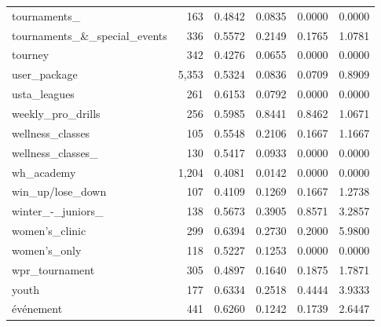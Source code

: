 \begin{table}[htbp]
\begin{tabular}{lrrrrr}
  tournaments\_ & 163 & 0.4842 & 0.0835 & 0.0000 & 0.0000 \\
  tournaments\_\&\_special\_events & 336 & 0.5572 & 0.2149 & 0.1765 & 1.0781 \\
  tourney & 342 & 0.4276 & 0.0655 & 0.0000 & 0.0000 \\
  user\_package & 5,353 & 0.5324 & 0.0836 & 0.0709 & 0.8909 \\
  usta\_leagues & 261 & 0.6153 & 0.0792 & 0.0000 & 0.0000 \\
  weekly\_pro\_drills & 256 & 0.5985 & 0.8441 & 0.8462 & 1.0671 \\
  wellness\_classes & 105 & 0.5548 & 0.2106 & 0.1667 & 1.1667 \\
  wellness\_classes\_ & 130 & 0.5417 & 0.0933 & 0.0000 & 0.0000 \\
  wh\_academy & 1,204 & 0.4081 & 0.0142 & 0.0000 & 0.0000 \\
  win\_up/lose\_down & 107 & 0.4109 & 0.1269 & 0.1667 & 1.2738 \\
  winter\_-\_juniors\_ & 138 & 0.5673 & 0.3905 & 0.8571 & 3.2857 \\
  women's\_clinic & 299 & 0.6394 & 0.2730 & 0.2000 & 5.9800 \\
  women's\_only & 118 & 0.5227 & 0.1253 & 0.0000 & 0.0000 \\
  wpr\_tournament & 305 & 0.4897 & 0.1640 & 0.1875 & 1.7871 \\
  youth & 177 & 0.6334 & 0.2518 & 0.4444 & 3.9333 \\
  événement & 441 & 0.6260 & 0.1242 & 0.1739 & 2.6447 \\
\bottomrule
\end{tabular}
\end{table}
